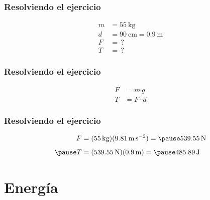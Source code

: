 \documentclass[14pt]{beamer}
\begin{document}
\begin{frame}
\frametitle{Resolviendo el ejercicio}
\pause
\begin{align*}
m &= \SI{55}{\kilo\gram} \\[0.5em]
d &= \SI{90}{\centi\meter} = \SI{0.9}{\meter} \\[0.5em]
F &= \, ? \\[0.5em]
T &= \, ?
\end{align*}
\end{frame}
\begin{frame}
\frametitle{Resolviendo el ejercicio}
\begin{align*}
F &= m \, g \\[0.5em]
T &= F \cdot d
\end{align*}
\end{frame}
\begin{frame}
\frametitle{Resolviendo el ejercicio}
\begin{eqnarray*}
\begin{aligned}
F &= (\SI{55}{\kilo\gram})(\SI{9.81}{\meter\per\square\second}) = \pause \SI{539.55}{\newton} \\[0.5em] \pause
T &= (\SI{539.55}{\newton})(\SI{0.9}{\meter}) = \pause \SI{485.89}{\joule}
\end{aligned}
\end{eqnarray*}
\end{frame}

\section{Energía}
\end{document}

